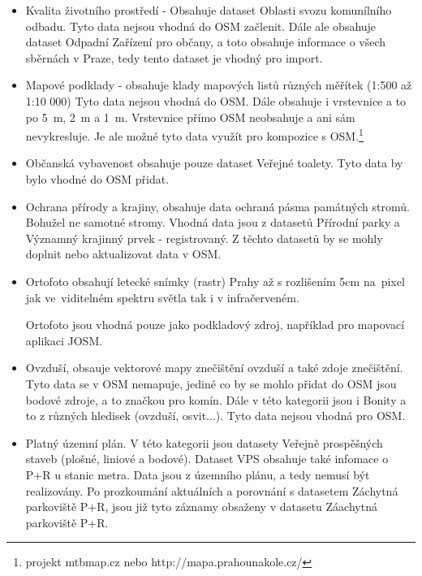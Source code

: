 \begin{itemize}
    \item   Kvalita životního prostředí - Obsahuje dataset Oblasti svozu komunílního odbadu.
            Tyto data nejsou vhodná do OSM začlenit. Dále ale obsahuje dataset
            Odpadní Zařízení pro občany, a toto obsahuje informace o všech sběrnách v Praze,
            tedy tento dataset je vhodný pro import.

    \item   Mapové podklady - obsahuje klady mapových listů různých měřítek (1:500 až 1:10 000)
            Tyto data nejsou vhodná do OSM. Dále obsahuje i vrstevnice a to po
            5~m, 2~m a 1~m. Vrstevnice přímo OSM neobsahuje a ani sám nevykresluje.
            Je ale možné tyto data využít pro kompozice s OSM.\footnote{projekt mtbmap.cz nebo http://mapa.prahounakole.cz/}

    \item   Občanská vybavenost obsahuje pouze dataset Veřejné toalety.
            Tyto data by bylo vhodné do OSM přidat.

    \item   Ochrana přírody a krajiny, obsahuje data ochraná pásma památných stromů.
            Bohužel ne samotné stromy. Vhodná data jsou z datasetů Přírodní parky a
            Významný krajinný prvek - registrovaný. Z těchto datasetů by se mohly
            doplnit nebo aktualizovat data v OSM.

    \item   Ortofoto obsahují letecké snímky (rastr) Prahy až s rozlišením 5cm
            na~pixel jak ve~viditelném spektru světla tak i v infračerveném.

            Ortofoto jsou vhodná pouze jako podkladový zdroj,
            například pro mapovací aplikaci JOSM.

    \item   Ovzduší, obsauje vektorové mapy znečištění ovzduší a také
            zdoje znečištění. Tyto data se v OSM nemapuje, jediné co by se
            mohlo přidat do OSM jsou bodové zdroje, a to značkou pro komín.
            Dále v této kategorii jsou i Bonity a to z různých hledisek (ovzduší, osvit...).
            Tyto data nejsou vhodná pro OSM.

    \item   Platný územní plán. V této kategorii jsou datasety Veřejně prospěšných staveb
            (plošné, liniové a bodové). Dataset VPS obsahuje také infomace o P+R u stanic metra.
            Data jsou z územního plánu, a tedy nemusí být realizovány.
            Po prozkoumání aktuálních a porovnání s datasetem Záchytná parkoviště P+R,
            jsou již tyto záznamy obsaženy v datasetu Záachytná parkoviště P+R.


\end{itemize}
